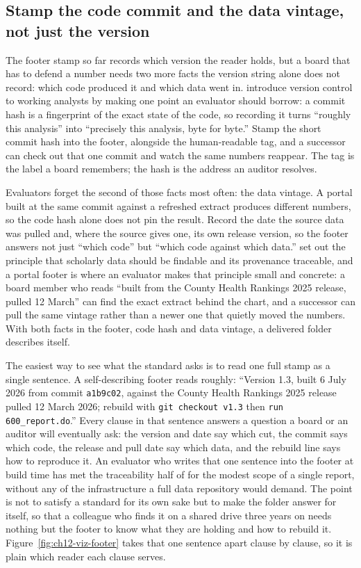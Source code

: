 \subsection{Stamp the code commit and the data vintage, not just the version}
The footer stamp so far records which version the reader holds, but a board that has to defend a number needs two more facts the version string alone does not record: which code produced it and which data went in. \textcite{blischak2016git} introduce version control to working analysts by making one point an evaluator should borrow: a commit hash is a fingerprint of the exact state of the code, so recording it turns \enquote{roughly this analysis} into \enquote{precisely this analysis, byte for byte.} Stamp the short commit hash into the footer, alongside the human-readable tag, and a successor can check out that one commit and watch the same numbers reappear. The tag is the label a board remembers; the hash is the address an auditor resolves.

Evaluators forget the second of those facts most often: the data vintage. A portal built at the same commit against a refreshed extract produces different numbers, so the code hash alone does not pin the result. Record the date the source data was pulled and, where the source gives one, its own release version, so the footer answers not just \enquote{which code} but \enquote{which code against which data.} \textcite{wilkinson2016fair} set out the principle that scholarly data should be findable and its provenance traceable, and a portal footer is where an evaluator makes that principle small and concrete: a board member who reads \enquote{built from the County Health Rankings 2025 release, pulled 12 March} can find the exact extract behind the chart, and a successor can pull the same vintage rather than a newer one that quietly moved the numbers. With both facts in the footer, code hash and data vintage, a delivered folder describes itself.

The easiest way to see what the standard asks is to read one full stamp as a single sentence. A self-describing footer reads roughly: \enquote{Version 1.3, built 6 July 2026 from commit \texttt{a1b9c02}, against the County Health Rankings 2025 release pulled 12 March 2026; rebuild with \texttt{git checkout v1.3} then \texttt{run 600\_report.do}.} Every clause in that sentence answers a question a board or an auditor will eventually ask: the version and date say which cut, the commit says which code, the release and pull date say which data, and the rebuild line says how to reproduce it. An evaluator who writes that one sentence into the footer at build time has met the traceability half of \textcite{wilkinson2016fair} for the modest scope of a single report, without any of the infrastructure a full data repository would demand. The point is not to satisfy a standard for its own sake but to make the folder answer for itself, so that a colleague who finds it on a shared drive three years on needs nothing but the footer to know what they are holding and how to rebuild it. Figure~\ref{fig:ch12-viz-footer} takes that one sentence apart clause by clause, so it is plain which reader each clause serves.

